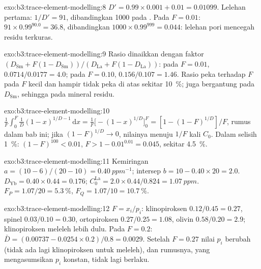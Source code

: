 \begin{solution}{exo:b3:trace-element-modelling:8}
$D' = 0.99\times0.001 + 0.01 = 0.01099$. Lelehan pertama: $1/D' = 91$, dibandingkan
1000 pada . Pada $F = 0.01$: $91\times0.99^{90.0} = 36.8$,
dibandingkan $1000\times0.99^{999} = 0.044$: lelehan pori mencegah residu
terkuras.
\end{solution}

\begin{solution}{exo:b3:trace-element-modelling:9}
Rasio dinaikkan dengan faktor $(D_{\mathrm{Sm}} + F(1 - D_{\mathrm{Sm}}))/(D_{\mathrm{La}}
+ F(1 - D_{\mathrm{La}}))$: pada $F = 0.01$, $0.0714/0.0177 = 4.0$; pada $F = 0.10$,
$0.156/0.107 = 1.46$. Rasio peka terhadap $F$ pada $F$ kecil dan hampir
tidak peka di atas sekitar \qty{10}{\percent}; juga bergantung pada $D_{\mathrm{Sm}}$,
sehingga pada mineral residu.
\end{solution}

\begin{solution}{exo:b3:trace-element-modelling:10}
$\frac1F\int_0^F \frac1D(1 - x)^{1/D - 1}\,\mathrm dx = \frac1F\bigl[-(1 -
x)^{1/D}\bigr]_0^F = [1 - (1 - F)^{1/D}]/F$, rumus dalam bab ini; jika
$(1 - F)^{1/D} \to 0$, nilainya menuju $1/F$ kali $C_0$. Dalam selisih \qty{1}{\percent}:
$(1 - F)^{100} < 0.01$, $F > 1 - 0.01^{0.01} = 0.045$, sekitar
\qty{4.5}{\percent}.
\end{solution}

\begin{solution}{exo:b3:trace-element-modelling:11}
Kemiringan $a = (10 - 6)/(20 - 10) = \qty{0.40}{ppm^{-1}}$; intersep $b = 10 -
0.40\times20 = 2.0$. $D_{\mathrm{Yb}} = 0.40\times0.44 = 0.176$;
$C_0^{\mathrm{La}} = 2.0\times0.44/0.824 = \qty{1.07}{ppm}$. $F_P = 1.07/20 =
\qty{5.3}{\percent}$, $F_Q = 1.07/10 = \qty{10.7}{\percent}$.
\end{solution}

\begin{solution}{exo:b3:trace-element-modelling:12}
$F = x_i/p_i$: klinopiroksen $0.12/0.45 = 0.27$, spinel $0.03/0.10 = 0.30$,
ortopiroksen $0.27/0.25 = 1.08$, olivin $0.58/0.20 = 2.9$; klinopiroksen
meleleh lebih dulu. Pada $F = 0.2$: $\bar D = (0.00737 - 0.0254\times0.2)/0.8 =
0.0029$. Setelah $F = 0.27$ nilai $p_i$ berubah (tidak ada lagi klinopiroksen untuk meleleh),
dan rumusnya, yang mengasumsikan $p_i$ konstan, tidak lagi berlaku.
\end{solution}

